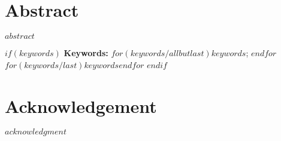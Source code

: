 
\pagestyle{empty}	   %
\cleardoublepage

\cleardoublepage

\pagestyle{plain}				%
\declaration
\cleardoublepage

\chapter*{Abstract}
\label{sec:abstract}
\vspace*{-10mm}

$abstract$

$if(keywords)$
\textbf{Keywords: } $for(keywords/allbutlast)$$keywords$; $endfor$$for(keywords/last)$$keywords$$endfor$
$endif$
\cleardoublepage

\chapter*{Acknowledgement}
\label{sec:acknowledgement}
\vspace*{-10mm}

$acknowledgment$
\cleardoublepage

\setcounter{tocdepth}{2}		%
\tableofcontents				%
\cleardoublepage

\listoffigures
\cleardoublepage

\listoftables
\cleardoublepage

\setcounter{page}{1}			%
\pagestyle{maincontentstyle} 	%
